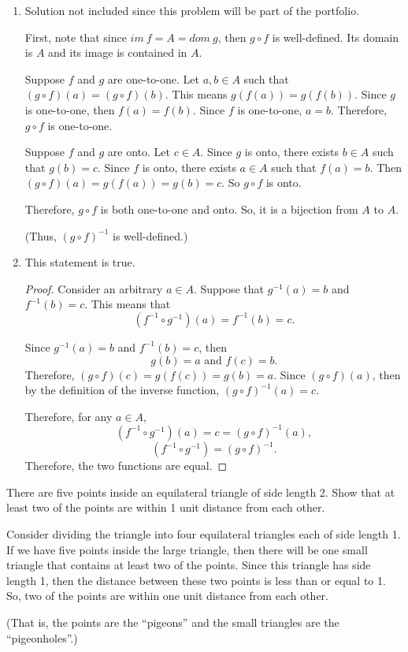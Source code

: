 \documentclass{article}
\theoremstyle{definition}
\begin{document}
\begin{solution}
\begin{enumerate}
    \item Solution not included since this problem will be part of the portfolio.
    
    First, note that since $im \ f = A = dom \ g$, then $g \circ f$ is well-defined.  Its domain is $A$ and its image is contained in $A$.

Suppose $f$ and $g$ are one-to-one. Let $a, b\in A$ such that $(g\circ f)(a)=(g\circ f)(b)$. This means $g(f(a))=g(f(b))$. Since $g$ is one-to-one, then $f(a)=f(b)$. Since $f$ is one-to-one, $a=b$. Therefore, $g\circ f$ is one-to-one.

Suppose $f$ and $g$ are onto. Let $c\in A$. Since $g$ is onto, there exists $b\in A$ such that $g(b)=c$. Since $f$ is onto, there exists $a\in A$ such that $f(a)=b$. Then $(g\circ f)(a)=g(f(a))=g(b)=c$. So $g\circ f$ is onto.

  Therefore, $g\circ f$ is both one-to-one and onto.  So, it is a bijection from $A$ to $A$.  

{\color{gray}(Thus, $(g \circ f)^{-1}$ is well-defined.)}

    \item This statement is true.
\begin{proof}
Consider an arbitrary $a \in A$.  Suppose that $g^{-1}(a) = b$ and $f^{-1}(b) = c$.  This means that \[ (f^{-1} \circ g^{-1})(a) = f^{-1}(b) = c. \]

Since $g^{-1}(a) = b$ and $f^{-1}(b) = c$, then
\[ g(b) = a \text{ and } f(c) = b. \]
Therefore, $(g\circ f)(c) = g(f(c)) = g(b) = a$.  Since $(g\circ f)(a)$, then by the definition of the inverse function, $(g\circ f)^{-1}(a) = c$.

Therefore, for any $a \in A$, 
	\[(f^{-1} \circ g^{-1})(a) = c = (g \circ f)^{-1}(a),\]
	\[(f^{-1} \circ g^{-1})=  (g \circ f)^{-1}.\]	
Therefore, the two functions are equal.
\end{proof}
    \end{enumerate}

\end{solution}

\begin{question}
    There are five points inside an equilateral triangle of side length 2. Show that at least two of the points are within 1 unit distance from each other.
\end{question}
\begin{solution}
Consider dividing the triangle into four equilateral triangles each of side length 1.  If we have five points inside the large triangle, then there will be one small triangle that contains at least two of the points.  Since this triangle has side length 1, then the distance between these two points is less than or equal to 1.  So, two of the points are within one unit distance from each other.

(That is, the points are the ``pigeons'' and the small triangles are the ``pigeonholes''.)
\end{solution}
\end{document}

